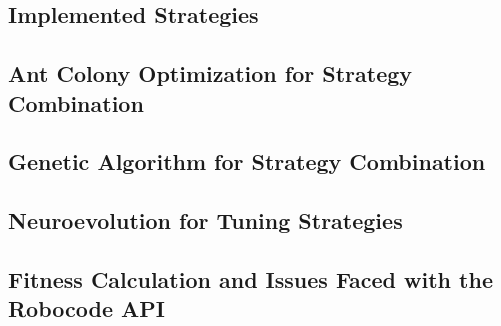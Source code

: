 \subsection{Implemented Strategies}


\subsection{Ant Colony Optimization for Strategy Combination}


\subsection{Genetic Algorithm for Strategy Combination}


\subsection{Neuroevolution for Tuning Strategies}


\subsection{Fitness Calculation and Issues Faced with the Robocode API}


